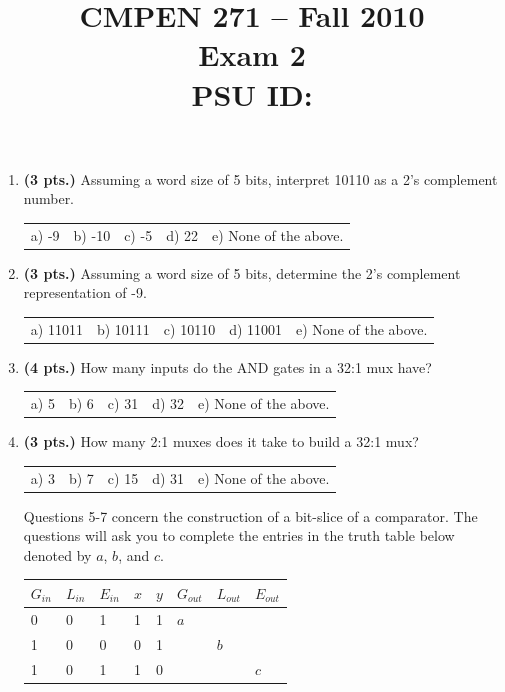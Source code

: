 \documentclass{article}
\begin{document}
\newcommand{\bs}{\backslash}

\title{
\Large{CMPEN 271 -- Fall 2010}\\
\normalsize{Exam 2}\\
PSU ID:}
\date{}
\maketitle{}

\begin{enumerate}
\item {\bf (3 pts.)} Assuming a word size of 5 bits, interpret 10110 
as a 2's complement number.

\begin{tabular}{p{0.6in} p{0.6in} p{0.6in} p{0.6in} l}
a) -9 & b) -10 & c) -5 & d) 22 & e) None of the above.
\end{tabular}

\item {\bf (3 pts.)} Assuming a word size of 5 bits, determine the 2's complement
representation of -9.

\begin{tabular}{p{0.6in} p{0.6in} p{0.6in} p{0.6in} l}
a) 11011 & b) 10111 & c) 10110 & d) 11001 & e) None of the above.
\end{tabular}

\item {\bf (4 pts.)} How many inputs do the AND gates in a 32:1 mux have?
\begin{tabular}{p{0.6in} p{0.6in} p{0.6in} p{0.6in} l}
a) 5 & b) 6 & c) 31 & d) 32 & e) None of the above.
\end{tabular}

\item {\bf (3 pts.)} How many 2:1 muxes does it take to build a 32:1 mux?

\begin{tabular}{p{0.6in} p{0.6in} p{0.6in} p{0.6in} l}
a) 3 & b) 7 & c) 15 & d) 31 & e) None of the above.
\end{tabular}

Questions 5-7 concern the construction of a bit-slice of a comparator.  
The questions will ask you to complete the entries in the truth table 
below denoted by $a$, $b$, and $c$.

\begin{tabular}{l|l|l|l|l||l|l|l}
$G_{in}$ & $L_{in}$ & $E_{in}$ & $x$ & $y$ & $G_{out}$ & $L_{out}$ & $E_{out}$ \\ \hline
    0    &    0     &     1    &  1  &  1  &   $a$     &           &  \\ \hline
    1    &    0     &     0    &  0  &  1  &           &   $b$     &  \\ \hline
    1    &    0     &     1    &  1  &  0  &           &           &  $c$    \\
\end{tabular}


\end{enumerate}
\end{document}
